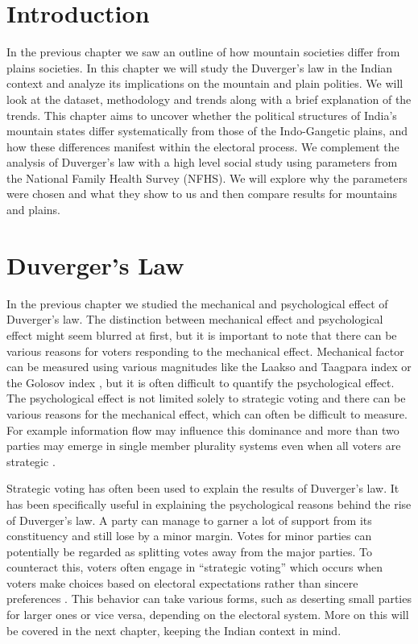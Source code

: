\section{Introduction}
In the previous chapter we saw an outline of how mountain societies differ from plains societies. In this chapter we will study the Duverger's law in the Indian context and analyze its implications on the mountain and plain polities.  We will look at the dataset, methodology and trends along with a brief explanation of the trends. This chapter aims to uncover whether the political structures of India's mountain states differ systematically from those of the Indo-Gangetic plains, and how these differences manifest within the electoral process.  We complement the analysis of Duverger's law with a high level social study using parameters from the National Family Health Survey (NFHS). We will explore why the parameters were chosen and what they show to us and then compare results for mountains and plains.
\section{Duverger's Law}

In the previous chapter we studied the mechanical and psychological effect of Duverger’s law. The distinction between mechanical effect and psychological effect might seem blurred at first, but it is important to note that there can be various reasons for voters responding to the mechanical effect. Mechanical factor can be measured using various magnitudes like the Laakso and Taagpara index \citep{laakso1979effective} or the Golosov index \citep{golosov2010effective}, but it is often difficult to quantify the psychological effect. The psychological effect is not limited solely to strategic voting and there can be various reasons for the mechanical effect, which can often be difficult to measure. For example information flow may influence this dominance and more than two parties may emerge in single member plurality systems even when all voters are strategic \citep{clough2007strategic}. 

\vspace{0.3cm}

Strategic voting has often been used to explain the results of Duverger's law. It has been specifically useful in explaining the psychological reasons behind the rise of Duverger's law. A party can manage to garner a lot of support from its constituency and still lose by a minor margin. Votes for minor parties can potentially be regarded as splitting votes away from the major parties. To counteract this, voters often engage in \enquote{strategic voting}  which occurs when voters make choices based on electoral expectations rather than sincere preferences \citep{Bol2019StrategicVV}. This behavior can take various forms, such as deserting small parties for larger ones or vice versa, depending on the electoral system. More on this will be covered in the next chapter, keeping the Indian context in mind. 
 
